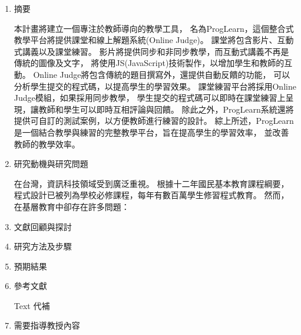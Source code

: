 \documentclass[12pt]{article}
\begin{document}
\date{}
\usetikzlibrary{automata, positioning, arrows}
{}

\begin{enumerate}
  \setlength{\parindent}{2em}
  \item 摘要 
    \par 本計畫將建立一個專注於教師導向的教學工具，
    名為ProgLearn，這個整合式教學平台將提供課堂和線上解題系統(Online Judge)。
    課堂將包含影片、互動式講義以及課堂練習。
    影片將提供同步和非同步教學，而互動式講義不再是傳統的圖像及文字，
    將使用JS(JavaScript)技術製作，以增加學生和教師的互動。
    Online Judge將包含傳統的題目撰寫外，還提供自動反饋的功能，
    可以分析學生提交的程式碼，以提高學生的學習效果。
    課堂練習平台將採用Online Judge模組，如果採用同步教學，
    學生提交的程式碼可以即時在課堂練習上呈現，讓教師和學生可以即時互相評論與回饋。
    除此之外，ProgLearn系統還將提供可自訂的測試案例，以方便教師進行練習的設計。
    綜上所述，ProgLearn是一個結合教學與練習的完整教學平台，旨在提高學生的學習效率，
    並改善教師的教學效率。
  \item 研究動機與研究問題
    \par 在台灣，資訊科技領域受到廣泛重視。
    根據十二年國民基本教育課程綱要\cite{ref1}，
    程式設計已被列為學校必修課程，每年有數百萬學生修習程式教育。
    然而，在基層教育中卻存在許多問題：
  \item 文獻回顧與探討
  \item 研究方法及步驟
  \item 預期結果
  \item 參考文獻
    \renewcommand{\section}[2]{}
    \begin{thebibliography}{99}  
       Text 代補
    \end{thebibliography} 
  \item 需要指導教授內容
\end{enumerate}
\end{document}
